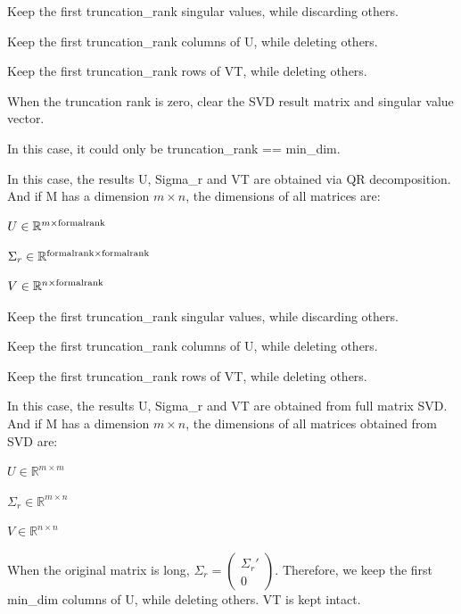 Keep the first {\ttfamily truncation\+\_\+rank} singular values, while discarding others.

Keep the first {\ttfamily truncation\+\_\+rank} columns of {\ttfamily U}, while deleting others.

Keep the first {\ttfamily truncation\+\_\+rank} rows of {\ttfamily VT}, while deleting others.

When the truncation rank is zero, clear the S\+VD result matrix and singular value vector.

In this case, it could only be {\ttfamily truncation\+\_\+rank} == {\ttfamily min\+\_\+dim}.

In this case, the results {\ttfamily U}, {\ttfamily Sigma\+\_\+r} and {\ttfamily VT} are obtained via QR decomposition. And if {\ttfamily M} has a dimension $m \times n$, the dimensions of all matrices are\+:
\begin{DoxyItemize}
\item $U \in \mathbb{R}^{m \times {\rm formal rank}}$
\item $\Sigma_r \in \mathbb{R}^{{\rm formal rank} \times {\rm formal rank}}$
\item $V \in \mathbb{R}^{n \times {\rm formal rank}}$
\end{DoxyItemize}

Keep the first {\ttfamily truncation\+\_\+rank} singular values, while discarding others.

Keep the first {\ttfamily truncation\+\_\+rank} columns of {\ttfamily U}, while deleting others.

Keep the first {\ttfamily truncation\+\_\+rank} rows of {\ttfamily VT}, while deleting others.

In this case, the results {\ttfamily U}, {\ttfamily Sigma\+\_\+r} and {\ttfamily VT} are obtained from full matrix S\+VD. And if {\ttfamily M} has a dimension $m \times n$, the dimensions of all matrices obtained from S\+VD are\+:
\begin{DoxyItemize}
\item $U \in \mathbb{R}^{m \times m}$
\item $\Sigma_r \in \mathbb{R}^{m \times n}$
\item $V \in \mathbb{R}^{n \times n}$
\end{DoxyItemize}

When the original matrix is long, $\Sigma_r = \begin{pmatrix}\Sigma_r' \\ 0 \end{pmatrix}$. Therefore, we keep the first {\ttfamily min\+\_\+dim} columns of {\ttfamily U}, while deleting others. {\ttfamily VT} is kept intact.

